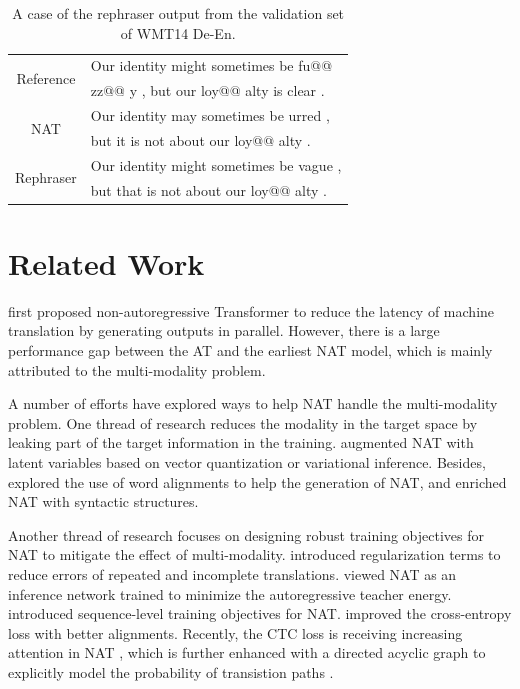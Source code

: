 \documentclass[letterpaper]{article} %
\begin{document}
\begin{table}[h]
\small
\centering
\begin{tabular}{c|l}
\toprule
\multirow{2}{*}{Reference} & Our identity might sometimes be fu@@ \\ &zz@@ y , but our loy@@ alty is clear .\\
\hline
\multirow{2}{*}{NAT} & Our identity may sometimes be urred ,\\& but it is not about our loy@@ alty .\\
\hline
\multirow{2}{*}{Rephraser} & Our identity might sometimes be vague ,\\& but that is not about our loy@@ alty .\\
\bottomrule
\end{tabular}
\caption{A case of the rephraser output from the validation set of WMT14 De-En.}
\label{tab:case}
\end{table}
\section{Related Work}
\citet{gu2017non} first proposed non-autoregressive Transformer to reduce the latency of machine translation by generating outputs in parallel. However, there is a large performance gap between the AT and the earliest NAT model, which is mainly attributed to the multi-modality problem.

A number of efforts have explored ways to help NAT handle the multi-modality problem. One thread of research reduces the modality in the target space by leaking part of the target information in the training. \citet{kaiser2018fast,Ma_2019,Shu2020LatentVariableNN,bao-etal-2021-non} augmented NAT with latent variables based on vector quantization or variational inference. Besides, \citet{gu2017non,ran2019guiding,bao2019nonautoregressive,song-etal-2021-alignart} explored the use of word alignments to help the generation of NAT, and \citet{akoury-etal-2019-syntactically,liu-etal-2021-enriching} enriched NAT with syntactic structures.

Another thread of research focuses on designing robust training objectives for NAT to mitigate the effect of multi-modality. \citet{wang2019non} introduced regularization terms to reduce errors of repeated and incomplete translations. \cite{tu-etal-2020-engine} viewed NAT as an inference network trained to minimize the autoregressive teacher energy. \citet{shao-etal-2019-retrieving,DBLP:conf/aaai/ShaoZFMZ20,DBLP:journals/corr/abs-2106-08122} introduced sequence-level training objectives for NAT. \citet{Aligned,DBLP:conf/icml/DuTJ21} improved the cross-entropy loss with better alignments. Recently, the CTC loss \cite{10.1145/1143844.1143891} is receiving increasing attention in NAT \cite{libovicky2018end,saharia-etal-2020-non,gu2020fully,nmla}, which is further enhanced with a directed acyclic graph to explicitly model the probability of transistion paths \cite{huang2022directed,shao2022viterbi}.
\end{document}
